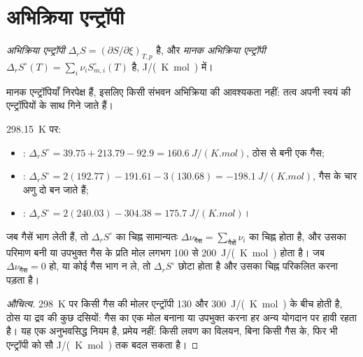 \section{अभिक्रिया एन्ट्रॉपी}

\begin{definition}[अभिक्रिया एन्ट्रॉपी]\label{def:b2:reaction-free-energy:reaction-entropy}
\emph{अभिक्रिया एन्ट्रॉपी} $\Delta_r S =
(\partial S/\partial\xi)_{T,p}$ है, और \emph{मानक अभिक्रिया
एन्ट्रॉपी} $\Delta_r S^\circ(T) =
\sum_i\nu_iS^\circ_{m,i}(T)$ है, \unit{J/(K.mol)} में।
\end{definition}

मानक एन्ट्रॉपियाँ निरपेक्ष हैं, इसलिए किसी संभवन अभिक्रिया की आवश्यकता नहीं:
तत्व अपनी स्वयं की एन्ट्रॉपियों के साथ गिने जाते हैं।

\begin{example}[तीन अभिक्रिया एन्ट्रॉपियाँ]\label{ex:b2:reaction-free-energy:entropies}
\qty{298.15}{K} पर:
\begin{itemize}
  \item {}: $\Delta_r S^\circ = 39.75 + 213.79 -
        92.9 = \qty{+160.6}{J/(K.mol)}$, ठोस से बनी एक गैस;
  \item {}: $\Delta_r S^\circ = 2(192.77) -
        191.61 - 3(130.68) = \qty{-198.1}{J/(K.mol)}$, गैस के चार अणु
        दो बन जाते हैं;
  \item {}: $\Delta_r S^\circ = 2(240.03) - 304.38 =
        \qty{+175.7}{J/(K.mol)}$।
\end{itemize}
\end{example}

\begin{proposition}[अभिक्रिया एन्ट्रॉपी का चिह्न]\label{prop:b2:reaction-free-energy:sign-rule}
जब गैसें भाग लेती हैं, तो $\Delta_r S^\circ$ का चिह्न सामान्यतः
$\Delta\nu_{\text{गैस}} = \sum_{\text{गैसें}}\nu_i$ का चिह्न होता है, और उसका परिमाण
बनी या उपभुक्त गैस के प्रति मोल लगभग \qty{100}{} से \qty{200}{J/(K.mol)} होता है। जब
$\Delta\nu_{\text{गैस}} = 0$ हो, या कोई गैस भाग न ले, तो $\Delta_r S^\circ$
छोटा होता है और उसका चिह्न परिकलित करना पड़ता है।
\end{proposition}

\begin{proof}[औचित्य]
\qty{298}{K} पर किसी गैस की मोलर एन्ट्रॉपी 130 और
\qty{300}{J/(K.mol)} के बीच होती है, ठोस या द्रव की कुछ दसियों: गैस का एक
मोल बनाना या उपभुक्त करना हर अन्य योगदान पर हावी रहता है। यह एक
अनुभवसिद्ध नियम है, प्रमेय नहीं: किसी लवण का विलयन, बिना किसी गैस के,
फिर भी एन्ट्रॉपी को सौ \unit{J/(K.mol)} तक बदल सकता है।
\end{proof}

